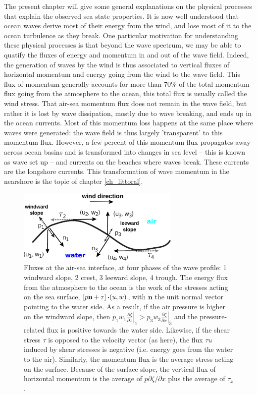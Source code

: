 The present chapter will give some general explanations on the physical processes that explain the observed sea state properties. It is now well understood that ocean waves derive most of their energy from the wind, and lose most of it to the ocean turbulence as they break. 
One particular motivation for understanding these physical processes is that beyond the wave spectrum, we may be able to quatify the fluxes of energy 
and momentum in and out of the wave field. 
Indeed, the generation of waves by the wind is thus associated to vertical fluxes of horizontal momentum and energy going 
from the wind to the wave field. This flux of momentum generally accounts for more than 70\% of the total momentum flux going 
from the atmosphere to the ocean, this total flux is usually called the wind stress. That air-sea momentum flux does not remain in the wave field, 
but rather it is lost by wave dissipation, mostly due to wave breaking, and ends up in the ocean currents. Most of this momentum 
loss happens at the same place where waves were generated: the wave field is thus largely 'transparent' to this momentum flux. However, a few percent of this 
momentum flux propagates away across ocean basins and is transformed into changes in sea level -- this is known as wave set up -- and currents on the beaches where waves break. 
These currents are the longshore currents. This transformation of wave momentum in the nearshore is the topic of chapter \ref{ch_littoral}. 
\begin{figure}[hbt]
\centerline{\includegraphics[width=0.7\textwidth]{FIGS_CH_SOURCETERMS/air_sea_fluxes_en.pdf}}
  \caption{Fluxes at the air-sea interface, at four phases of the wave profile: 1 windward slope, 2 crest, 3 leeward slope, 4 trough. 
The energy flux from the atmosphere to the ocean is the work of the stresses acting on the sea surface, 
   $\left[p \mathbf{n} + \tau\right] \mbox{\boldmath $\cdot$} (u,w)$, with $\mathbf{n}$ the unit normal vector pointing to the water side.
   As a result, if the air pressure is higher on the windward slope, then 
   $p_1 w_1 \left.\frac{\partial \zeta}{\partial x}\right|_1 > p_3 w_3 \left.\frac{\partial \zeta}{\partial x}\right|_3$
   and the pressure-related flux is positive towards the water side. 
   Likewise, if the shear stress  $\tau$ is opposed to the velocity vector (as here), the flux $\tau u$ induced by shear stresses is 
negative (i.e. energy goes from the water to the air). Similarly, the momentum flux is the average 
stress acting on the surface. Because of the surface slope, the vertical flux of horizontal momentum is the 
average of  $p {\partial \zeta}/{\partial x}$ plus the average of  $\tau_x$.} \label{airseaflux}
\end{figure}
